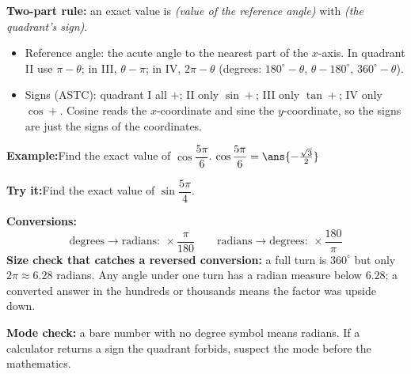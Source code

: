 \documentclass[12pt]{article}
\begin{document}


\begin{formulabox}
\textbf{Two-part rule:} an exact value is
\emph{(value of the reference angle)} with \emph{(the quadrant's sign)}.
\begin{itemize}[leftmargin=0.8cm, itemsep=1pt, topsep=2pt]
  \item Reference angle: the acute angle to the nearest part of the $x$-axis.
        In quadrant II use $\pi - \theta$; in III, $\theta - \pi$; in IV,
        $2\pi - \theta$ (degrees: $180^\circ - \theta$, $\theta - 180^\circ$,
        $360^\circ - \theta$).
  \item Signs (ASTC): quadrant I all $+$; II only $\sin +$; III only $\tan +$;
        IV only $\cos +$. Cosine reads the $x$-coordinate and sine the
        $y$-coordinate, so the signs are just the signs of the coordinates.
\end{itemize}
\end{formulabox}

\begin{examplebox}
\textbf{Example:}\quad Find the exact value of $\cos\dfrac{5\pi}{6}$.
$\cos\dfrac{5\pi}{6} = \ans{-\frac{\sqrt{3}}{2}}$
\end{examplebox}

\begin{tryitbox}
\textbf{Try it:}\quad Find the exact value of $\sin\dfrac{5\pi}{4}$.\\[2pt]
\end{tryitbox}


\begin{formulabox}
\textbf{Conversions:}
\[ \text{degrees} \rightarrow \text{radians}: \ \times \frac{\pi}{180}
   \qquad
   \text{radians} \rightarrow \text{degrees}: \ \times \frac{180}{\pi} \]
\textbf{Size check that catches a reversed conversion:} a full turn is
$360^\circ$ but only $2\pi \approx 6.28$ radians. Any angle under one turn has a
radian measure below $6.28$; a converted answer in the hundreds or thousands means
the factor was upside down.\par
\smallskip
\textbf{Mode check:} a bare number with no degree symbol means radians. If a
calculator returns a sign the quadrant forbids, suspect the mode before the
mathematics.
\end{formulabox}
\end{document}
